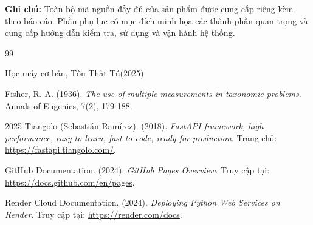 \documentclass[14pt]{extarticle}
\begin{document}
	
	
	\noindent
	\textbf{Ghi chú:} Toàn bộ mã nguồn đầy đủ của sản phẩm được cung cấp
	riêng kèm theo báo cáo. Phần phụ lục có mục đích minh họa các thành phần
	quan trọng và cung cấp hướng dẫn kiểm tra, sử dụng và vận hành hệ thống.
	
	
	\renewcommand{\refname}{TÀI LIỆU THAM KHẢO}
	
	\begin{thebibliography}{99}
		
		Học máy cơ bản, Tôn Thất Tú(2025) 
		
		Fisher, R. A. (1936). 
		\textit{The use of multiple measurements in taxonomic problems}. 
		Annals of Eugenics, 7(2), 179-188.
		
		2025
		Tiangolo (Sebastián Ramírez). (2018). 
		\textit{FastAPI framework, high performance, easy to learn, fast to code, ready for production}. 
		Trang chủ: \url{https://fastapi.tiangolo.com/}.
		
		GitHub Documentation. (2024). 
		\textit{GitHub Pages Overview}. 
		Truy cập tại: \url{https://docs.github.com/en/pages}.
		
		Render Cloud Documentation. (2024). 
		\textit{Deploying Python Web Services on Render}. 
		Truy cập tại: \url{https://render.com/docs}.
		
	\end{thebibliography}
	
\end{document}
